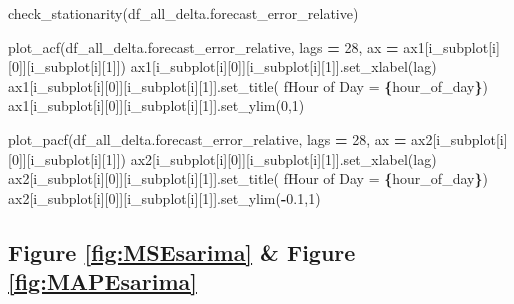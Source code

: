 \documentclass[mstat,12pt]{unswthesis}
\newenvironment{Shaded}{\begin{snugshade}}{\end{snugshade}}
\newcommand{\DecValTok}[1]{\textcolor[rgb]{0.00,0.00,0.81}{#1}}
\newcommand{\FloatTok}[1]{\textcolor[rgb]{0.00,0.00,0.81}{#1}}
\newcommand{\NormalTok}[1]{#1}
\newcommand{\OperatorTok}[1]{\textcolor[rgb]{0.81,0.36,0.00}{\textbf{#1}}}
\newcommand{\SpecialCharTok}[1]{\textcolor[rgb]{0.81,0.36,0.00}{\textbf{#1}}}
\newcommand{\SpecialStringTok}[1]{\textcolor[rgb]{0.31,0.60,0.02}{#1}}
\newcommand{\StringTok}[1]{\textcolor[rgb]{0.31,0.60,0.02}{#1}}
\begin{document}
\begin{Shaded}
\begin{Highlighting}[]
\NormalTok{    check\_stationarity(df\_all\_delta.forecast\_error\_relative)}

\NormalTok{    plot\_acf(df\_all\_delta.forecast\_error\_relative, lags }\OperatorTok{=} \DecValTok{28}\NormalTok{, }
\NormalTok{        ax }\OperatorTok{=}\NormalTok{ ax1[i\_subplot[i][}\DecValTok{0}\NormalTok{]][i\_subplot[i][}\DecValTok{1}\NormalTok{]])}
\NormalTok{    ax1[i\_subplot[i][}\DecValTok{0}\NormalTok{]][i\_subplot[i][}\DecValTok{1}\NormalTok{]].set\_xlabel(}\StringTok{\textquotesingle{}lag\textquotesingle{}}\NormalTok{)}
\NormalTok{    ax1[i\_subplot[i][}\DecValTok{0}\NormalTok{]][i\_subplot[i][}\DecValTok{1}\NormalTok{]].set\_title(}
        \SpecialStringTok{f\textquotesingle{}Hour of Day = }\SpecialCharTok{\{}\NormalTok{hour\_of\_day}\SpecialCharTok{\}}\SpecialStringTok{\textquotesingle{}}\NormalTok{)    }
\NormalTok{    ax1[i\_subplot[i][}\DecValTok{0}\NormalTok{]][i\_subplot[i][}\DecValTok{1}\NormalTok{]].set\_ylim(}\DecValTok{0}\NormalTok{,}\DecValTok{1}\NormalTok{)}

\NormalTok{    plot\_pacf(df\_all\_delta.forecast\_error\_relative, }
\NormalTok{      lags }\OperatorTok{=} \DecValTok{28}\NormalTok{, ax }\OperatorTok{=}\NormalTok{ ax2[i\_subplot[i][}\DecValTok{0}\NormalTok{]][i\_subplot[i][}\DecValTok{1}\NormalTok{]])}
\NormalTok{    ax2[i\_subplot[i][}\DecValTok{0}\NormalTok{]][i\_subplot[i][}\DecValTok{1}\NormalTok{]].set\_xlabel(}\StringTok{\textquotesingle{}lag\textquotesingle{}}\NormalTok{)}
\NormalTok{    ax2[i\_subplot[i][}\DecValTok{0}\NormalTok{]][i\_subplot[i][}\DecValTok{1}\NormalTok{]].set\_title(}
        \SpecialStringTok{f\textquotesingle{}Hour of Day = }\SpecialCharTok{\{}\NormalTok{hour\_of\_day}\SpecialCharTok{\}}\SpecialStringTok{\textquotesingle{}}\NormalTok{)  }
\NormalTok{    ax2[i\_subplot[i][}\DecValTok{0}\NormalTok{]][i\_subplot[i][}\DecValTok{1}\NormalTok{]].set\_ylim(}\OperatorTok{{-}}\FloatTok{0.1}\NormalTok{,}\DecValTok{1}\NormalTok{)}
\end{Highlighting}
\end{Shaded}

\subsection*{Figure \ref{fig:MSEsarima} \& Figure \ref{fig:MAPEsarima}}\label{figure-reffigmsesarima-figure-reffigmapesarima}
\end{document}
